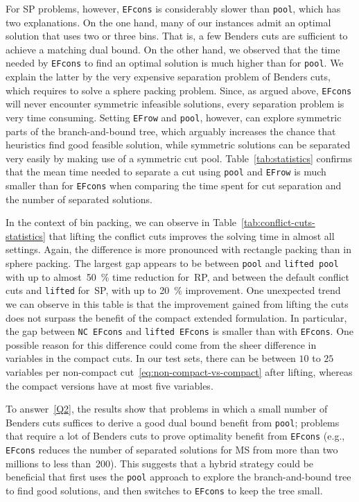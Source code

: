 \documentclass[a4paper,10pt]{article}
\newcommand{\setting}[1]{\texttt{#1}}
\newcommand{\rectanglepack}{RP\xspace}
\newcommand{\spherepack}{SP\xspace}
\newcommand{\scheduling}{MS\xspace}
\theoremstyle{definition}
\begin{document}
For \spherepack problems, however, \setting{EFcons} is considerably slower than \setting{pool}, which has two explanations.
On the one hand, many of our instances admit an optimal solution that uses two or three bins.
That is, a few Benders cuts are sufficient to achieve a matching dual bound.
On the other hand, we observed that the time needed by \setting{EFcons} to find an optimal solution is much higher than for \setting{pool}.
We explain the latter by the very expensive separation problem of Benders cuts, which requires to solve a sphere packing problem.
Since, as argued above, \setting{EFcons} will never encounter symmetric infeasible solutions, every separation problem is very time consuming.
Setting \setting{EFrow} and \setting{pool}, however, can explore symmetric parts of the branch-and-bound tree, which arguably increases the chance that heuristics find good feasible solution, while symmetric solutions can be separated very easily by making use of a symmetric cut pool.
Table~\ref{tab:statistics} confirms that the mean time needed to separate a cut using \setting{pool} and \setting{EFrow} is much smaller than for \setting{EFcons} when comparing the time spent for cut separation and the number of separated solutions.

In the context of bin packing, we can observe in Table~\ref{tab:conflict-cuts-statistics} that lifting the conflict cuts improves the solving time in almost all settings.
Again, the difference is more pronounced with rectangle packing than in sphere packing.
The largest gap appears to be between \setting{pool} and \setting{lifted pool} with up to almost~\SI{50}{\percent} time reduction for~\rectanglepack, and between the default conflict cuts and \setting{lifted} for~\spherepack, with up to \SI{20}{\percent} improvement. 
One unexpected trend we can observe in this table is that the improvement gained from lifting the cuts does not surpass the benefit of the compact extended formulation.
In particular, the gap between \setting{NC EFcons} and \setting{lifted EFcons} is smaller than with \setting{EFcons}.
One possible reason for this difference could come from the sheer difference in variables in the compact cuts.
In our test sets, there can be between $10$ to $25$ variables per non-compact cut~\eqref{eq:non-compact-vs-compact} after lifting, whereas the compact versions have at most five variables.

To answer~\eqref{Q2}, the results show that problems in which a small number of Benders cuts suffices to derive a good dual bound benefit from \setting{pool}; problems that require a lot of Benders cuts to prove optimality benefit from \setting{EFcons} (e.g., \setting{EFcons} reduces the number of separated solutions for \scheduling from more than two millions to less than~200).
This suggests that a hybrid strategy could be beneficial that first uses the \setting{pool} approach to explore the branch-and-bound tree to find good solutions, and then switches to \setting{EFcons} to keep the tree small.
\end{document}
